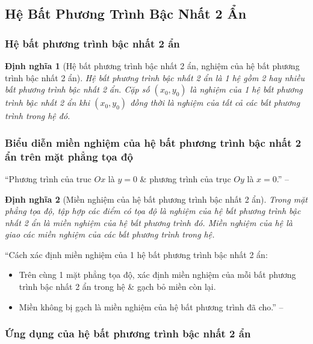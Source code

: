 \documentclass{article}
\numberwithin{equation}{section}
\newtheorem{definition}{Định nghĩa}[section]
\begin{document}
\subsection{Hệ Bất Phương Trình Bậc Nhất 2 Ẩn}

\subsubsection{Hệ bất phương trình bậc nhất 2 ẩn}

\begin{definition}[Hệ bất phương trình bậc nhất 2 ẩn, nghiệm của hệ bất phương trình bậc nhất 2 ẩn]
	\emph{Hệ bất phương trình bậc nhất 2 ẩn} là 1 hệ gồm 2 hay nhiều bất phương trình bậc nhất 2 ẩn. Cặp số $(x_0,y_0)$ là \emph{nghiệm} của 1 hệ bất phương trình bậc nhất 2 ẩn khi $(x_0,y_0)$ đồng thời là nghiệm của tất cả các bất phương trình trong hệ đó.
\end{definition}

\subsubsection{Biểu diễn miền nghiệm của hệ bất phương trình bậc nhất 2 ẩn trên mặt phẳng tọa độ}
``Phương trình của truc $Ox$ là $y = 0$ \& phương trình của trục $Oy$ là $x = 0$.'' -- \cite[p. 27]{Khoai_Anh_Tan_Thang_Anh_Cuong_Duong_Dang_Ha_Hanh_Hong_Son_Tuan_Vuong_Toan_10_tap_1}

\begin{definition}[Miền nghiệm của hệ bất phương trình bậc nhất 2 ẩn]
	 Trong mặt phẳng tọa độ, tập hợp các điểm có tọa độ là nghiệm của hệ bất phương trình bậc nhất 2 ẩn là \emph{miền nghiệm} của hệ bất phương trình đó. \emph{Miền nghiệm} của hệ là giao các miền nghiệm của các bất phương trình trong hệ.
\end{definition}
``Cách xác định miền nghiệm của 1 hệ bất phương trình bậc nhất 2 ẩn:
\begin{itemize}
	\item Trên cùng 1 mặt phẳng tọa độ, xác định miền nghiệm của mỗi bất phương trình bậc nhất 2 ẩn trong hệ \& gạch bỏ miền còn lại.
	\item Miền không bị gạch là miền nghiệm của hệ bất phương trình đã cho.'' -- \cite[p. 28]{Khoai_Anh_Tan_Thang_Anh_Cuong_Duong_Dang_Ha_Hanh_Hong_Son_Tuan_Vuong_Toan_10_tap_1}
\end{itemize}

\subsubsection{Ứng dụng của hệ bất phương trình bậc nhất 2 ẩn}
\end{document}
